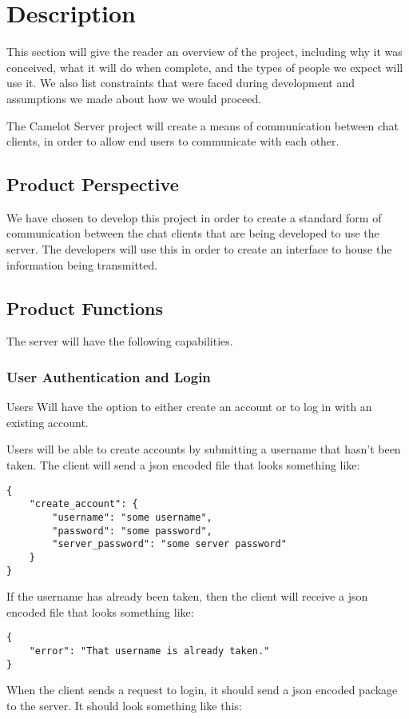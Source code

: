 \chapter{Description}\label{description}
This section will give the reader an overview of the project, including why it was conceived, what it will do when complete, and the types of people we expect will use it. We also list constraints that were faced during development and assumptions we made about how we would proceed.

The Camelot Server project will create a means of communication between chat clients, in order to allow end users to communicate with each other.

\section{Product Perspective}\label{product-perspective}
We have chosen to develop this project in order to create a standard form of communication between the chat clients that are being developed to use the server. The developers will use this in order to create an interface to house the information being transmitted.

\section{Product Functions}\label{product-functions}
The server will have the following capabilities.

\subsection{User Authentication and Login}
Users Will have the option to either create an account or to log in with an existing account.

Users will be able to create accounts by submitting a username that hasn't been taken. The client will send a \gls{json} encoded file that looks something like:

\begin{lstlisting}[style=json]
{
    "create_account": {
        "username": "some username",
        "password": "some password",
        "server_password": "some server password"
    }
}
\end{lstlisting}

If the username has already been taken, then the client will receive a \gls{json} encoded file that looks something like:

\begin{lstlisting}[style=json]
{
    "error": "That username is already taken."
}
\end{lstlisting}
When the client sends a request to login, it should send a \gls{json} encoded package to the server. It should look something like this:


